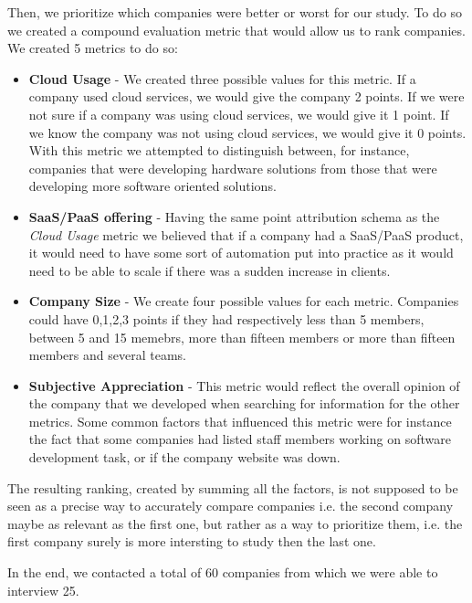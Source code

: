       Then, we prioritize which companies were better or worst for our study. To do so we created a compound evaluation metric that would allow us to rank companies. We created 5 metrics to do so:
      \begin{itemize}
        \item \textbf{Cloud Usage} - We created three possible values for this metric. If a company used cloud services, we would give the company 2 points. If we were not sure if a company was using cloud services, we would give it 1 point. If we know the company was not using cloud services, we would give it 0 points. With this metric we attempted to distinguish between, for instance, companies that were developing hardware solutions from those that were developing more software oriented solutions.

        \item \textbf{SaaS/PaaS offering} - Having the same point attribution schema as the \textit{Cloud Usage} metric we believed that if a company had a SaaS/PaaS product, it would need to have some sort of automation put into practice as it would need to be able to scale if there was a sudden increase in clients.

        \item \textbf{Company Size} - We create four possible values for each metric. Companies could have 0,1,2,3 points if they had respectively less than 5 members, between 5 and 15 memebrs, more than fifteen members or more than fifteen members and several teams.

        \item \textbf{Subjective Appreciation} - This metric would reflect the overall opinion of the company that we developed when searching for information for the other metrics. Some common factors that influenced this metric were for instance the fact that some companies had listed staff members working on software development task, or if the company website was down.
      \end{itemize}

      The resulting ranking, created by summing all the factors, is not supposed to be seen as a precise way to accurately compare companies i.e. the second company maybe as relevant as the first one, but rather as a way to prioritize them, i.e. the first company surely is more intersting to study then the last one.

      In the end, we contacted a total of 60 companies from which we were able to interview 25.


